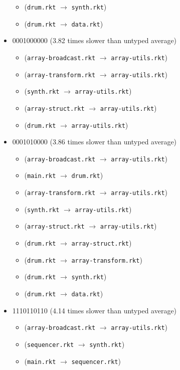 \documentclass{article}
\newcommand{\mono}[1]{\texttt{#1}}
\begin{document}
\begin{itemize}
\begin{itemize}
  \item (\mono{drum.rkt} $\rightarrow$ \mono{synth.rkt})
  \item (\mono{drum.rkt} $\rightarrow$ \mono{data.rkt})
  \end{itemize}
\item 0001000000 (3.82 times slower than untyped average)
  \begin{itemize}
  \item (\mono{array-broadcast.rkt} $\rightarrow$ \mono{array-utils.rkt})
  \item (\mono{array-transform.rkt} $\rightarrow$ \mono{array-utils.rkt})
  \item (\mono{synth.rkt} $\rightarrow$ \mono{array-utils.rkt})
  \item (\mono{array-struct.rkt} $\rightarrow$ \mono{array-utils.rkt})
  \item (\mono{drum.rkt} $\rightarrow$ \mono{array-utils.rkt})
  \end{itemize}
\item 0001010000 (3.86 times slower than untyped average)
  \begin{itemize}
  \item (\mono{array-broadcast.rkt} $\rightarrow$ \mono{array-utils.rkt})
  \item (\mono{main.rkt} $\rightarrow$ \mono{drum.rkt})
  \item (\mono{array-transform.rkt} $\rightarrow$ \mono{array-utils.rkt})
  \item (\mono{synth.rkt} $\rightarrow$ \mono{array-utils.rkt})
  \item (\mono{array-struct.rkt} $\rightarrow$ \mono{array-utils.rkt})
  \item (\mono{drum.rkt} $\rightarrow$ \mono{array-struct.rkt})
  \item (\mono{drum.rkt} $\rightarrow$ \mono{array-transform.rkt})
  \item (\mono{drum.rkt} $\rightarrow$ \mono{synth.rkt})
  \item (\mono{drum.rkt} $\rightarrow$ \mono{data.rkt})
  \end{itemize}
\item 1110110110 (4.14 times slower than untyped average)
  \begin{itemize}
  \item (\mono{array-broadcast.rkt} $\rightarrow$ \mono{array-utils.rkt})
  \item (\mono{sequencer.rkt} $\rightarrow$ \mono{synth.rkt})
  \item (\mono{main.rkt} $\rightarrow$ \mono{sequencer.rkt})

\end{itemize}
\end{itemize}
\end{document}
